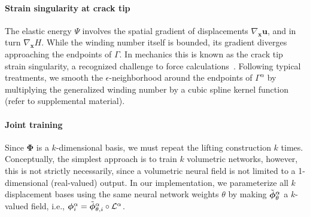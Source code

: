 \paragraph{Strain singularity at crack tip}
The elastic energy $\Psi$ involves the spatial gradient of displacements $\nabla_{\bm{x}}\bm{u}$, and in turn $\nabla_{\bm{x}}H$. While the winding number itself is bounded, its gradient diverges approaching the endpoints of $\Gamma$. In mechanics this is known as the crack tip strain singularity, a recognized challenge to force calculations~\cite{Mousavi:XFEM:2011}.  Following typical treatments, we smooth the $\epsilon$-neighborhood around the endpoints of $\Gamma^\alpha$ by multiplying the generalized winding number by a cubic spline kernel function (refer to supplemental material).

\paragraph{Joint training}
Since $\bm{\Phi}$ is a $k$-dimensional basis, we must repeat the lifting construction $k$ times. Conceptually, the simplest approach is to train $k$ volumetric networks, however, this is not strictly necessarily, since a volumetric neural field is not limited to a 1-dimensional (real-valued) output. In our implementation, we parameterize all $k$ displacement bases using the same neural network weights $\theta$ by making $\Tilde{\bm{\phi}}_\theta^\alpha$ a $k$-valued field, i.e.,
$\bm{\phi}_i^\alpha = \Tilde{\bm{\phi}}_{\theta,i}^\alpha \circ \mathcal{L}^{\alpha}$.


